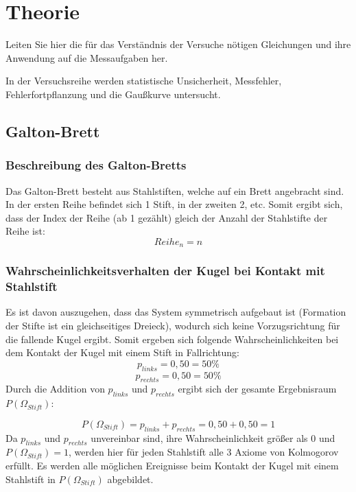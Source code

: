 \section{Theorie}

Leiten Sie hier die für das Verständnis der Versuche nötigen Gleichungen und ihre
Anwendung auf die Messaufgaben her.


In der Versuchsreihe werden statistische Unsicherheit, Messfehler, Fehlerfortpflanzung und die Gaußkurve untersucht.

\subsection{Galton-Brett}
\subsubsection{Beschreibung des Galton-Bretts}
Das Galton-Brett besteht aus Stahlstiften, welche auf ein Brett angebracht sind. In der ersten Reihe befindet sich 1 Stift, in der zweiten 2, etc. 
Somit ergibt sich, dass der Index der Reihe (ab 1 gezählt) gleich der Anzahl der Stahlstifte der Reihe ist:
\begin{equation}
    Reihe_n = n
\end{equation}

\subsubsection{Wahrscheinlichkeitsverhalten der Kugel bei Kontakt mit Stahlstift}
Es ist davon auszugehen, dass das System symmetrisch aufgebaut ist (Formation der Stifte ist ein gleichseitiges Dreieck), wodurch sich keine Vorzugsrichtung für die fallende Kugel ergibt. Somit ergeben sich folgende Wahrscheinlichkeiten bei dem Kontakt der Kugel mit einem Stift in Fallrichtung:
\begin{equation}
        p_{links} = 0,50 = 50\%
\end{equation}
\begin{equation}
    p_{rechts} = 0,50 = 50\%       
\end{equation}
Durch die Addition von $p_{links}$ und $p_{rechts}$ ergibt sich der gesamte Ergebnisraum $P(\Omega_{Stift})$:

\begin{equation}
    P(\Omega_{Stift}) = p_{links} + p_{rechts} = 0,50 + 0,50 = 1
\end{equation}
Da $p_{links}$ und $p_{rechts}$ unvereinbar sind, ihre Wahrscheinlichkeit größer als 0 und $P(\Omega_{Stift}) = 1 $, werden hier für jeden Stahlstift alle 3 Axiome von Kolmogorov erfüllt. Es werden alle möglichen Ereignisse beim Kontakt der Kugel mit einem Stahlstift in $P(\Omega_{Stift})$ abgebildet.

